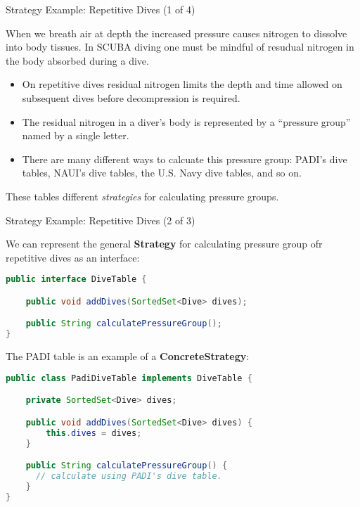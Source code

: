 \documentclass{beamer}
\begin{document}
\begin{frame}[fragile]{Strategy Example: Repetitive Dives (1 of 4)}

\vspace{-.07in}
When we breath air at depth the increased pressure causes nitrogen to dissolve into body tissues.  In SCUBA diving one must be mindful of resudual nitrogen in the body absorbed during a dive.  
\begin{itemize}
\item On repetitive dives residual nitrogen limits the depth and time allowed on subsequent dives before decompression is required.
\item The residual nitrogen in a diver's body is represented by a ``pressure group'' named by a single letter.
\item There are many different ways to calcuate this pressure group: PADI's dive tables, NAUI's dive tables, the U.S. Navy dive tables, and so on.
\end{itemize}
These tables different {\it strategies} for calculating pressure groups. 


\end{frame}

\begin{frame}[fragile]{Strategy Example: Repetitive Dives (2 of 3)}

\vspace{-.05in}
We can represent the general {\bf Strategy} for calculating pressure group ofr repetitive dives as an interface:
\vspace{-.05in}
\begin{lstlisting}[language=Java]
public interface DiveTable {

    public void addDives(SortedSet<Dive> dives);

    public String calculatePressureGroup();
}
\end{lstlisting}
The PADI table is an example of a {\bf ConcreteStrategy}:
\vspace{-.05in}
\begin{lstlisting}[language=Java]
public class PadiDiveTable implements DiveTable {

    private SortedSet<Dive> dives;

    public void addDives(SortedSet<Dive> dives) {
        this.dives = dives;
    }

    public String calculatePressureGroup() {
      // calculate using PADI's dive table.
    }
}
\end{lstlisting}


\end{frame}
\end{document}

